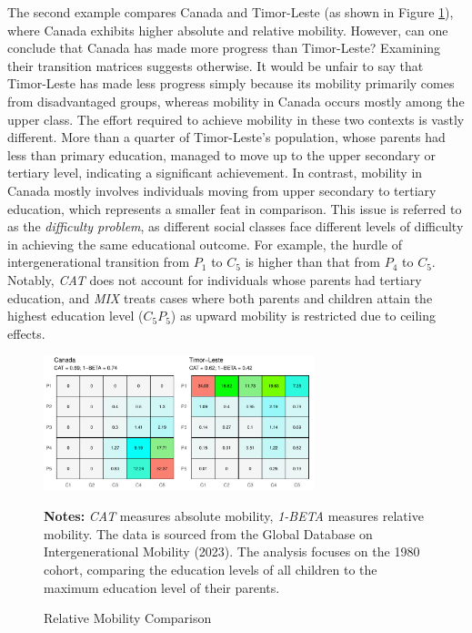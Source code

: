 The second example compares Canada and Timor-Leste (as shown in Figure \ref{fig:compare2}), where Canada exhibits higher absolute and relative mobility. However, can one conclude that Canada has made more progress than Timor-Leste? Examining their transition matrices suggests otherwise. It would be unfair to say that Timor-Leste has made less progress simply because its mobility primarily comes from disadvantaged groups, whereas mobility in Canada occurs mostly among the upper class. The effort required to achieve mobility in these two contexts is vastly different. More than a quarter of Timor-Leste's population, whose parents had less than primary education, managed to move up to the upper secondary or tertiary level, indicating a significant achievement. In contrast, mobility in Canada mostly involves individuals moving from upper secondary to tertiary education, which represents a smaller feat in comparison. This issue is referred to as the \textit{difficulty problem}, as different social classes face different levels of difficulty in achieving the same educational outcome. For example, the hurdle of intergenerational transition from $P_1$ to $C_5$ is higher than that from $P_4$ to $C_5$. Notably, \textit{CAT} does not account for individuals whose parents had tertiary education, and \textit{MIX} treats cases where both parents and children attain the highest education level ($C_5P_5$) as upward mobility is restricted due to ceiling effects.

\begin{figure}[h!]
    \centering
    \includegraphics[width=0.7\textwidth]{figs/compare2.pdf}
    \caption{Relative Mobility Comparison}
    \label{fig:compare2}
    \begin{minipage}{1\linewidth}
	\vspace{0.2cm}
	\footnotesize
	\textbf{Notes:} \textit{CAT} measures absolute mobility, \textit{1-BETA} measures relative mobility. The data is sourced from the Global Database on Intergenerational Mobility (2023). The analysis focuses on the 1980 cohort, comparing the education levels of all children to the maximum education level of their parents.		
\end{minipage}
\end{figure} 

